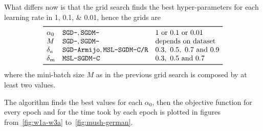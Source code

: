 What differs now is that the grid search finds the best hyper-parameters for each learning rate in \numlist{1; 0.1; 0.01}, hence the grids are
\[
\begin{array}{lll}
\toprule
\alpha_0 & \text{\texttt{SGD-}}, \text{\texttt{SGDM-}} & \text{\numlist[list-separator={ or },list-final-separator={ or }]{1;0.1;0.01}} \\
M & \text{\texttt{SGD-}}, \text{\texttt{SGDM-}} & \text{depends on dataset} \\
\delta_a & \text{\texttt{SGD-Armijo}}, \text{\texttt{MSL-SGDM-C/R}} & \numlist{0.3; 0.5; 0.7; 0.9} \\
\delta_m & \text{\texttt{MSL-SGDM-C}} & \numlist{0.3; 0.5; 0.7} \\
\bottomrule
\end{array}
\]
where the mini-batch size $M$ as in the previous grid search is composed by at least two values.

The algorithm finds the best values for each $\alpha_0$, then the objective function for every epoch and for the time took by each epoch is plotted in figures from~\vref{fig:w1a-w3a} to~\ref{fig:mush-german}.




